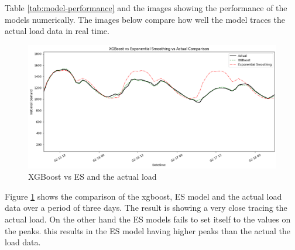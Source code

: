  Table \ref{tab:model-performance} and the images showing the performance of the models numerically. The images below compare how well the model traces the actual load data in real time. 


 \begin{figure}[h!]
 	\centering
 	\includegraphics[width=0.75\linewidth]{Chapters/images/results/xgboost_vs_expsmoothing}
 	\caption{XGBoost vs ES and the actual load}
 	\label{fig:xgboostvsexpsmoothing}
 \end{figure}
 
 Figure \ref{fig:xgboostvsexpsmoothing} shows the comparison of the xgboost, ES model and the actual load data over a period of three days. The result is showing a very close tracing the actual load. On the other hand the ES models fails to set itself to the values on the peaks. this results in the ES model having higher peaks than the actual the load data.
 
